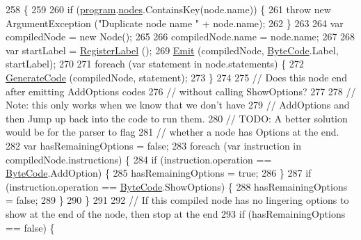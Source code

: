 \begin{DoxyCode}
258                                                     \{
259 
260             \textcolor{keywordflow}{if} (\hyperlink{a00029_aa1737da428ec7d597009661dd8a47829}{program}.\hyperlink{a00067_a3f4928a577c88263ad016be259b175c4}{nodes}.ContainsKey(node.name)) \{
261                 \textcolor{keywordflow}{throw} \textcolor{keyword}{new} ArgumentException (\textcolor{stringliteral}{"Duplicate node name "} + node.name);
262             \}
263 
264             var compiledNode =  \textcolor{keyword}{new} Node();
265 
266             compiledNode.name = node.name;
267 
268             var startLabel = \hyperlink{a00029_a1bae0d8b701a59708641aa36ea971fa5}{RegisterLabel} ();
269             \hyperlink{a00029_a774e8c143cdda0584fcfdda98626a83c}{Emit} (compiledNode, \hyperlink{a00026_ad5dfb6ee68ca7469623ad3e459f98894}{ByteCode}.Label, startLabel);
270 
271             \textcolor{keywordflow}{foreach} (var statement \textcolor{keywordflow}{in} node.statements) \{
272                 \hyperlink{a00029_a006f3becd521cc179ba3d3352f6f930b}{GenerateCode} (compiledNode, statement);
273             \}
274 
275             \textcolor{comment}{// Does this node end after emitting AddOptions codes}
276             \textcolor{comment}{// without calling ShowOptions?}
277 
278             \textcolor{comment}{// Note: this only works when we know that we don't have}
279             \textcolor{comment}{// AddOptions and then Jump up back into the code to run them.}
280             \textcolor{comment}{// TODO: A better solution would be for the parser to flag}
281             \textcolor{comment}{// whether a node has Options at the end.}
282             var hasRemainingOptions = \textcolor{keyword}{false};
283             \textcolor{keywordflow}{foreach} (var instruction \textcolor{keywordflow}{in} compiledNode.instructions) \{
284                 \textcolor{keywordflow}{if} (instruction.operation == \hyperlink{a00026_ad5dfb6ee68ca7469623ad3e459f98894}{ByteCode}.AddOption) \{
285                     hasRemainingOptions = \textcolor{keyword}{true};
286                 \}
287                 \textcolor{keywordflow}{if} (instruction.operation == \hyperlink{a00026_ad5dfb6ee68ca7469623ad3e459f98894}{ByteCode}.ShowOptions) \{
288                     hasRemainingOptions = \textcolor{keyword}{false};
289                 \}
290             \}
291 
292             \textcolor{comment}{// If this compiled node has no lingering options to show at the end of the node, then stop at
       the end}
293             \textcolor{keywordflow}{if} (hasRemainingOptions == \textcolor{keyword}{false}) \{

\end{DoxyCode}
